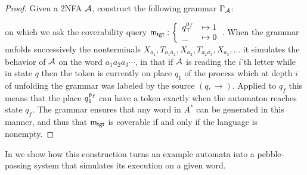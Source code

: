 \begin{textAtEnd}[category=hardness]
\begin{proof}
  Given a 2NFA $\mathcal{A}$, construct the following grammar $\Gamma_{\mathcal{A}}$:
  
  on which we ask the coverability query $\mathsf{m}_\mathsf{tgt} : \left\{\begin{array}{ll}q^{\mathsf{p}_f}_\top & \mapsto 1 \\ \_ & \mapsto 0\end{array}\right.$.
  When the grammar unfolds successively the nonterminals $X_{a_1}, T_{a_1 a_2}, X_{a_2}, T_{a_2 a_3}, X_{a_3}, ...$
  it simulates the behavior of $\mathcal{A}$ on the word $a_1 a_2 a_3 \cdots$,
  in that if $\mathcal{A}$ is reading the $i$'th letter while in state $q$
  then the token is currently on place $q_1$ of the process
  which at depth $i$ of unfolding the grammar was labeled by the source $(q, \rightarrow)$.
  Applied to $q_f$ this means that the place $q^{\mathsf{p}_f}_1$ can have a token
  exactly when the automaton reaches state $q_f$.
  The grammar ensures that any word in $A^*$ can be generated in this manner,
  and thus that $\mathsf{m}_\mathsf{tgt}$ is coverable if and only if the language is nonempty.
\end{proof}

\begin{example}
  In  we show how this construction turns an example automata
  into a pebble-passing system that simulates its execution on a given word.
\end{example}


\end{textAtEnd}


